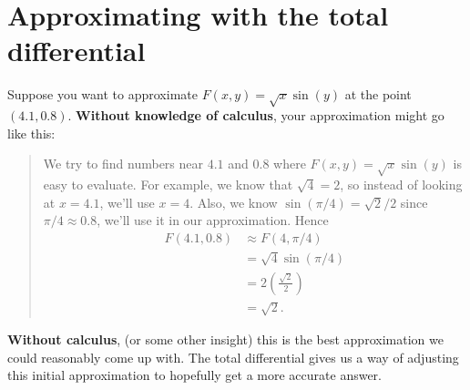 \documentclass{ximera}
\begin{document}
\section{Approximating with the total differential}

Suppose you want to approximate $F(x,y)=\sqrt{x}\sin(y)$ at the point
$(4.1,0.8)$. \textbf{Without knowledge of calculus}, your approximation might
go like this:
\begin{quote}
  We try to find numbers near $4.1$ and $0.8$ where
  $F(x,y)=\sqrt{x}\sin(y)$ is easy to evaluate. For example, we know
  that $\sqrt{4}= 2$, so instead of looking at $x=4.1$, we'll use
  $x=4$. Also, we know $\sin(\pi/4)= \sqrt{2}/2$ since $\pi/4\approx
  0.8$, we'll use it in our approximation. Hence
  \begin{align*}
  F(4.1,0.8) &\approx F(4,\pi/4) \\
  &= \sqrt{4}\sin(\pi/4)\\
  &= 2\left(\frac{\sqrt{2}}2\right)\\
  &= \sqrt{2}.
  \end{align*}
\end{quote}
\textbf{Without calculus}, (or some other insight) this is the best
approximation we could reasonably come up with. The total differential
gives us a way of adjusting this initial approximation to hopefully
get a more accurate answer.
\end{document}

